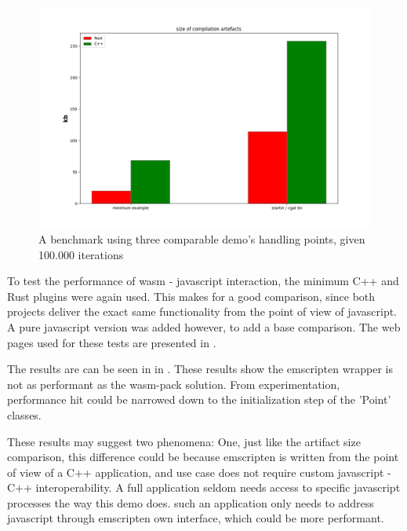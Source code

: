 \begin{figure}
  \graphicspath{{../../assets/plots/rust-cpp-compilation-size/}}
  \centering
  \includegraphics[width=\linewidth]{figure.png}
  \caption[]{A benchmark using three comparable demo's handling points, given 100.000 iterations}
  \label{fig:rust-cpp-performance}
\end{figure}

To test the performance of \ac{wasm} - javascript interaction, the minimum C++ and Rust plugins were again used. 
This makes for a good comparison, since both projects deliver the exact same functionality from the point of view of javascript.  
A pure javascript version was added however, to add a base comparison.
The web pages used for these tests are presented in .




The results are can be seen in in .
These results show the emscripten wrapper is not as performant as the wasm-pack solution.
From experimentation, performance hit could be narrowed down to the initialization step of the 'Point' classes. 

These results may suggest two phenomena:
One, just like the artifact size comparison, this difference could be because emscripten is written from the point of view of a C++ application, and use case does not require custom javascript - C++ interoperability. 
A full application seldom needs access to specific javascript processes the way this demo does. 
such an application only needs to address javascript through emscripten own interface, which could be more performant. 

